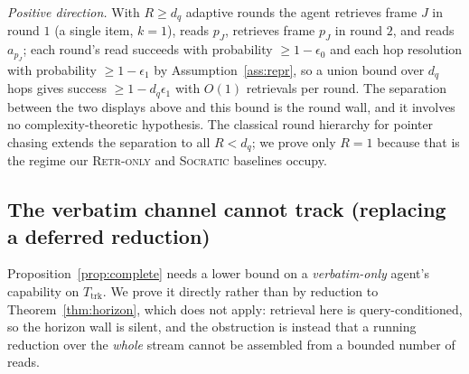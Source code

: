 \documentclass[10pt]{article}
\theoremstyle{definition}
\theoremstyle{plain}
\begin{document}
\emph{Positive direction.} With $R\ge d_q$ adaptive rounds the agent retrieves frame $J$ in round $1$ (a single item, $k=1$), reads $p_J$, retrieves frame $p_J$ in round $2$, and reads $a_{p_J}$; each round's read succeeds with probability $\ge1-\epsilon_0$ and each hop resolution with probability $\ge1-\epsilon_1$ by Assumption~\ref{ass:repr}, so a union bound over $d_q$ hops gives success $\ge1-d_q\epsilon_1$ with $O(1)$ retrievals per round. The separation between the two displays above and this bound is the round wall, and it involves no complexity-theoretic hypothesis. The classical round hierarchy for pointer chasing \citep{pointerchasing,nisanwigderson} extends the separation to all $R<d_q$; we prove only $R{=}1$ because that is the regime our \textsc{Retr-only} and \textsc{Socratic} baselines occupy.

\subsection{The verbatim channel cannot track (replacing a deferred reduction)}
Proposition~\ref{prop:complete} needs a lower bound on a \emph{verbatim-only} agent's capability on $T_{\mathrm{trk}}$. We prove it directly rather than by reduction to Theorem~\ref{thm:horizon}, which does not apply: retrieval here is query-conditioned, so the horizon wall is silent, and the obstruction is instead that a running reduction over the \emph{whole} stream cannot be assembled from a bounded number of reads.
\end{document}
